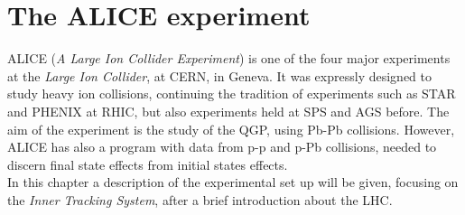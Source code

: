 \chapter{The ALICE experiment}
ALICE (\textit{A Large Ion Collider Experiment}) is one of the four major experiments at the \textit{Large Ion Collider}, at CERN, in Geneva. It was expressly designed to study heavy ion collisions, continuing the tradition of experiments such as STAR and PHENIX at RHIC, but also experiments held at SPS and AGS before. The aim of the experiment is the study of the QGP, using Pb-Pb collisions. However, ALICE has also a program with data from p-p and p-Pb collisions, needed to discern final state effects from initial states effects.\\
In this chapter a description of the experimental set up will be given, focusing on the \textit{Inner Tracking System}, after a brief introduction about the LHC.
